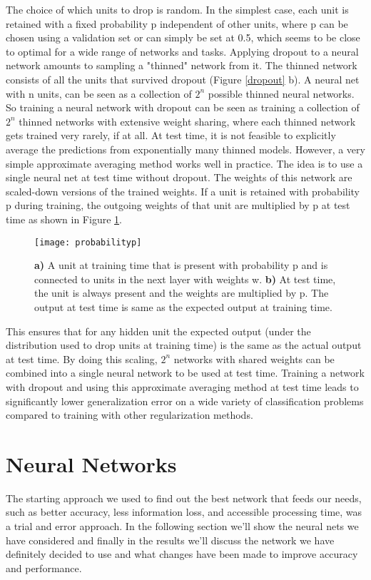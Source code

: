 \documentclass[../main.tex]{subfiles}
\begin{document}
The choice of which units to drop is random. In the simplest case, each unit is retained with a fixed probability p independent of other units, where p can be chosen using a validation set or can simply be set at 0.5, which seems to be close to optimal for a wide range of networks and tasks. Applying dropout to a neural network amounts to sampling a "thinned" network from
it. The thinned network consists of all the units that survived dropout (Figure \ref{dropout} b). A neural net with n units, can be seen as a collection of \(2^n\) possible thinned neural networks. So training a neural network with dropout can be seen as training a collection of \(2^n\) thinned networks with extensive weight sharing, where each thinned network gets trained
very rarely, if at all.
At test time, it is not feasible to explicitly average the predictions from exponentially
many thinned models. However, a very simple approximate averaging method works well in
practice. The idea is to use a single neural net at test time without dropout. The weights
of this network are scaled-down versions of the trained weights. If a unit is retained with
probability p during training, the outgoing weights of that unit are multiplied by p at test
time as shown in Figure \ref{probabilityp}.

\begin{figure}[htbp] 
\centering 
\texttt{[image: probabilityp]}
\caption{\textbf{a)} A unit at training time that is present with probability p and is connected to units
in the next layer with weights w. \textbf{b)} At test time, the unit is always present and the weights are multiplied by p. The output at test time is same as the expected output
at training time.} 
\label{probabilityp} 
\vspace{5mm}
\end{figure}

This ensures that for any hidden unit the expected output (under
the distribution used to drop units at training time) is the same as the actual output at
test time. By doing this scaling, \(2^n\) networks with shared weights can be combined into
a single neural network to be used at test time. Training a network with
dropout and using this approximate averaging method at test time leads to significantly
lower generalization error on a wide variety of classification problems compared to training
with other regularization methods.
\cite{overfitting,JMLR:v15:srivastava14a}


\section{Neural Networks}
The starting approach we used to find out the best network that feeds our needs, such as better accuracy, less information loss, and accessible processing time, was a trial and error approach. In the following section we'll show the neural nets we have considered and finally in the results we'll discuss the network we have definitely decided to use and what changes have been made to improve accuracy and performance.
\end{document}
